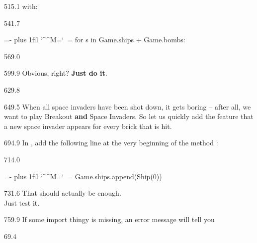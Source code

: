 \documentclass{aslab}
\makeatletter
\newcommand*\kw[1]{\textcolor{codeorange}{#1}}
\newcommand*\num[1]{\textcolor{codered}{#1}}
\newenvironment{pycode}{\par\ttfamily\hyphenchar\font=-1
  \lineskiplimit=-\maxdimen\lineskip=0pt\parindent=0pt
  \parfillskip=0pt plus 1fil\relax
  \catcode`\^^M=\active\catcode`\ =\active\py@setup\py@gobble}{}
\makeatother
\begin{document}
\begin{region}{515.1}
with:
\end{region}

\begin{region}[]{541.7}
\begin{pycode}
\kw{for} s \kw{in} Game.ships + Game.bombs:
\end{pycode}
\end{region}

\begin{region}{569.0}
\end{region}

\begin{region}{599.9}
Obvious, right? \textbf{Just do it}. 
\end{region}

\begin{region}{629.8}
\end{region}

\begin{region}[pitch=13.25]{649.5}
When all space invaders have been shot down, it gets boring -- after all, we
want to play Breakout \textbf{and} Space Invaders. So let us quickly add the
feature that a new space invader appears for every brick that is hit.
\end{region}

\begin{region}{694.9}
In , add the following line at the very beginning of the
method :
\end{region}

\begin{region}[]{714.0}
\begin{pycode}
Game.ships.append(Ship(\num{0}))
\end{pycode}
\end{region}

\begin{region}{731.6}
That should actually be enough.\\
Just test it.
\end{region}

\begin{region}{759.9}
If some import thingy is missing, an error message will tell you
\end{region}

\nextpage
\begin{region}{69.4}
\end{region}
\end{document}
